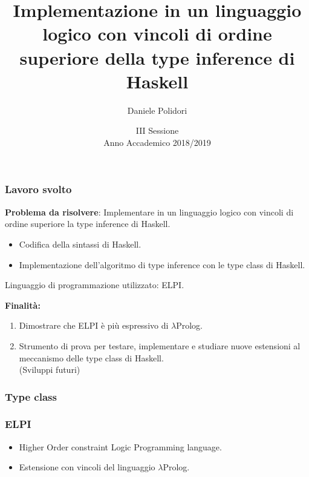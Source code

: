 \documentclass{beamer}
\title{Implementazione in un linguaggio logico con vincoli di ordine superiore della type inference di Haskell}
\author{Daniele Polidori}
\institute{Alma Mater Studiorum - Università di Bologna\\Corso di Laurea in Informatica}
\date{III Sessione\\Anno Accademico 2018/2019}
\begin{document}
{
\begin{frame}
 \titlepage     %
\end{frame}
}


\begin{frame}

 \frametitle{Lavoro svolto}
 
 \textbf{Problema da risolvere}: Implementare in un linguaggio logico con vincoli di ordine superiore la type inference di Haskell.
 \begin{itemize}
  \item Codifica della sintassi di Haskell.
  \item Implementazione dell’algoritmo di type inference con le type class di Haskell.
 \end{itemize}
 Linguaggio di programmazione utilizzato: ELPI.

 \vfill
 \textbf{Finalità:}
 \begin{enumerate}
  \item Dimostrare che ELPI è più espressivo di $\lambda$Prolog.
  \item Strumento di prova per testare, implementare e studiare nuove estensioni al meccanismo delle type class di Haskell.\\(Sviluppi futuri)
 \end{enumerate}

\end{frame}


\begin{frame}
 
 \frametitle{Type class}
 
 
\end{frame}


\begin{frame}

 \frametitle{ELPI}

 \begin{itemize}
  \item Higher Order constraint Logic Programming language.
  \item Estensione con vincoli del linguaggio $\lambda$Prolog.
 \end{itemize}

\end{frame}
\end{document}
